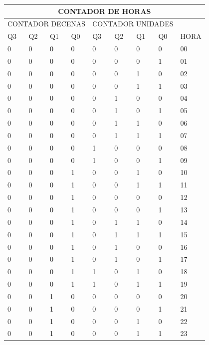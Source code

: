 \begin{table}[]
    \begin{tabular}{|l|l|l|l|l|l|l|l|l|}
    \hline
    \multicolumn{9}{|c|}{CONTADOR DE HORAS} \\ \hline
    \multicolumn{4}{|c|}{CONTADOR DECENAS} & \multicolumn{4}{c|}{CONTADOR UNIDADES} & \multicolumn{1}{c|}{} \\ \cline{1-8}
    Q3 & Q2 & Q1 & Q0 & Q3 & Q2 & Q1 & Q0 & \multicolumn{1}{c|}{\multirow{-2}{*}{HORA}} \\ \hline
    0 & 0 & 0 & 0 & 0 & 0 & 0 & 0 & 00 \\ \hline
    0 & 0 & 0 & 0 & 0 & 0 & 0 & 1 & 01 \\ \hline
    0 & 0 & 0 & 0 & 0 & 0 & 1 & 0 & 02 \\ \hline
    0 & 0 & 0 & 0 & 0 & 0 & 1 & 1 & 03 \\ \hline
    0 & 0 & 0 & 0 & 0 & 1 & 0 & 0 & 04 \\ \hline
    0 & 0 & 0 & 0 & 0 & 1 & 0 & 1 & 05 \\ \hline
    0 & 0 & 0 & 0 & 0 & 1 & 1 & 0 & 06 \\ \hline
    0 & 0 & 0 & 0 & 0 & 1 & 1 & 1 & 07 \\ \hline
    0 & 0 & 0 & 0 & 1 & 0 & 0 & 0 & 08 \\ \hline
    0 & 0 & 0 & 0 & 1 & 0 & 0 & 1 & 09 \\ \hline
    0 & 0 & 0 & 1 & 0 & 0 & 1 & 0 & 10 \\ \hline
    0 & 0 & 0 & 1 & 0 & 0 & 1 & 1 & 11 \\ \hline
    0 & 0 & 0 & 1 & 0 & 0 & 0 & 0 & 12 \\ \hline
    0 & 0 & 0 & 1 & 0 & 0 & 0 & 1 & 13 \\ \hline
    0 & 0 & 0 & 1 & 0 & 1 & 1 & 0 & 14 \\ \hline
    0 & 0 & 0 & 1 & 0 & 1 & 1 & 1 & 15 \\ \hline
    0 & 0 & 0 & 1 & 0 & 1 & 0 & 0 & 16 \\ \hline
    0 & 0 & 0 & 1 & 0 & 1 & 0 & 1 & 17 \\ \hline
    0 & 0 & 0 & 1 & 1 & 0 & 1 & 0 & 18 \\ \hline
    0 & 0 & 0 & 1 & 1 & 0 & 1 & 1 & 19 \\ \hline
    0 & 0 & 1 & 0 & 0 & 0 & 0 & 0 & 20 \\ \hline
    0 & 0 & 1 & 0 & 0 & 0 & 0 & 1 & 21 \\ \hline
    0 & 0 & 1 & 0 & 0 & 0 & 1 & 0 & 22 \\ \hline
    0 & 0 & 1 & 0 & 0 & 0 & 1 & 1 & 23 \\ \hline

\end{tabular}
\end{table}
